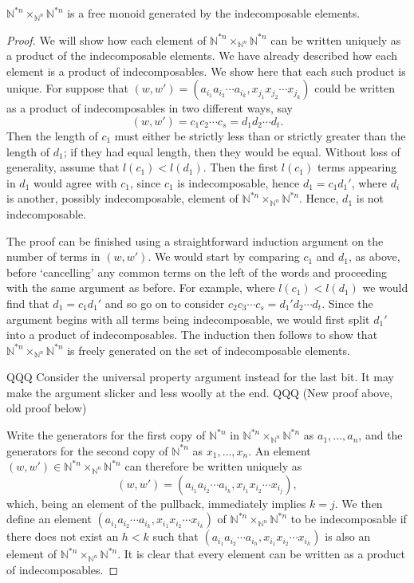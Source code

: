 \begin{lem}\label{freemon} $\mathbb{N}^{\ast n} \times_{\mathbb{N}^n} \mathbb{N}^{\ast n}$ is a free monoid generated by the indecomposable elements.
\end{lem}
\begin{proof}
We will show how each element of $\mathbb{N}^{\ast n} \times_{\mathbb{N}^n} \mathbb{N}^{\ast n}$ can be written uniquely as a product of the indecomposable elements. We have already described how each element is a product of indecomposables. We show here that each such product is unique. For suppose that $(w, w') = \left(a_{i_1}a_{i_2} \cdots a_{i_k}, x_{j_1} x_{j_2} \cdots x_{j_k}\right)$ could be written as a product of indecomposables in two different ways, say
  \[
    (w,w') = c_1 c_2 \cdots c_s = d_1 d_2 \cdots d_t.
  \]
Then the length of $c_1$ must either be strictly less than or strictly greater than the length of $d_1$; if they had equal length, then they would be equal. Without loss of generality, assume that $l(c_1) < l(d_1)$. Then the first $l(c_1)$ terms appearing in $d_1$ would agree with $c_1$, since $c_1$ is indecomposable, hence $d_1 = c_1 d_1'$, where $d_i$ is another, possibly indecomposable, element of $\mathbb{N}^{\ast n} \times_{\mathbb{N}^n} \mathbb{N}^{\ast n}$. Hence, $d_1$ is not indecomposable.

The proof can be finished using a straightforward induction argument on the number of terms in $(w,w')$. We would start by comparing $c_1$ and $d_1$, as above, before `cancelling' any common terms on the left of the words and proceeding with the same argument as before. For example, where $l(c_1) < l(d_1)$ we would find that $d_1 = c_1 d_1'$ and so go on to consider $c_2 c_3 \cdots c_s = d_1' d_2 \cdots d_t$. Since the argument begins with all terms being indecomposable, we would first split $d_1'$ into a product of indecomposables. The induction then follows to show that $\mathbb{N}^{\ast n} \times_{\mathbb{N}^n} \mathbb{N}^{\ast n}$ is freely generated on the set of indecomposable elements.

QQQ Consider the universal property argument instead for the last bit. It may make the argument slicker and less woolly at the end.
QQQ (New proof above, old proof below)

Write the generators for the first copy of $\mathbb{N}^{\ast n}$ in $\mathbb{N}^{\ast n} \times_{\mathbb{N}^n} \mathbb{N}^{\ast n}$ as $a_1, \ldots, a_n$, and the generators for the second copy of $\mathbb{N}^{\ast n}$ as $x_1, \ldots, x_n$. An element $(w,w') \in \mathbb{N}^{\ast n} \times_{\mathbb{N}^n} \mathbb{N}^{\ast n}$ can therefore be written uniquely as
  \[
    (w,w') = (a_{i_1} a_{i_2} \cdots a_{i_k}, x_{i_1} x_{i_2} \cdots x_{i_j}),
  \]
which, being an element of the pullback, immediately implies $k=j$. We then define an element $ (a_{i_1} a_{i_2} \cdots a_{i_k}, x_{i_1} x_{i_2} \cdots x_{i_k})$ of $\mathbb{N}^{\ast n} \times_{\mathbb{N}^n} \mathbb{N}^{\ast n}$ to be indecomposable if there does not exist an $h < k$ such that $ (a_{i_1} a_{i_2} \cdots a_{i_h}, x_{i_1} x_{i_2} \cdots x_{i_h})$ is also an element of $\mathbb{N}^{\ast n} \times_{\mathbb{N}^n} \mathbb{N}^{\ast n}$. It is clear that every element can be written as a product of indecomposables.


\end{proof}
